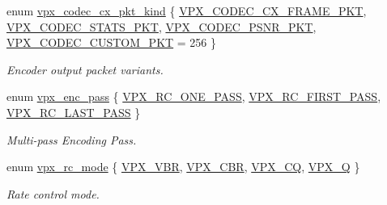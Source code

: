 \begin{DoxyCompactItemize}
\item 
enum \hyperlink{group__encoder_ga28a79375279536526552af3a83d2ed72}{vpx\-\_\-codec\-\_\-cx\-\_\-pkt\-\_\-kind} \{ \hyperlink{group__encoder_gga28a79375279536526552af3a83d2ed72a2261aae5594289400e812fb1e6b6b0cc}{\-V\-P\-X\-\_\-\-C\-O\-D\-E\-C\-\_\-\-C\-X\-\_\-\-F\-R\-A\-M\-E\-\_\-\-P\-K\-T}, 
\hyperlink{group__encoder_gga28a79375279536526552af3a83d2ed72a77cd8b95d9891bcce36117f5f31994fd}{\-V\-P\-X\-\_\-\-C\-O\-D\-E\-C\-\_\-\-S\-T\-A\-T\-S\-\_\-\-P\-K\-T}, 
\hyperlink{group__encoder_gga28a79375279536526552af3a83d2ed72a11eefa1328e6d22eb7c844645a260628}{\-V\-P\-X\-\_\-\-C\-O\-D\-E\-C\-\_\-\-P\-S\-N\-R\-\_\-\-P\-K\-T}, 
\hyperlink{group__encoder_gga28a79375279536526552af3a83d2ed72a7b54c122969397b1926de853d28b3c80}{\-V\-P\-X\-\_\-\-C\-O\-D\-E\-C\-\_\-\-C\-U\-S\-T\-O\-M\-\_\-\-P\-K\-T} =  256
 \}
\begin{DoxyCompactList}\small\item\em \-Encoder output packet variants. \end{DoxyCompactList}\item 
enum \hyperlink{group__encoder_ga476c5417f9c15a1dc5d3f68fa44c493f}{vpx\-\_\-enc\-\_\-pass} \{ \hyperlink{group__encoder_gga476c5417f9c15a1dc5d3f68fa44c493fa7b6943a41868e8e26a77e9500f139ca1}{\-V\-P\-X\-\_\-\-R\-C\-\_\-\-O\-N\-E\-\_\-\-P\-A\-S\-S}, 
\hyperlink{group__encoder_gga476c5417f9c15a1dc5d3f68fa44c493faa0765945345b160905f3b762986dae3b}{\-V\-P\-X\-\_\-\-R\-C\-\_\-\-F\-I\-R\-S\-T\-\_\-\-P\-A\-S\-S}, 
\hyperlink{group__encoder_gga476c5417f9c15a1dc5d3f68fa44c493fa65da543b956d6a9b1f301ab8cc90d3a7}{\-V\-P\-X\-\_\-\-R\-C\-\_\-\-L\-A\-S\-T\-\_\-\-P\-A\-S\-S}
 \}
\begin{DoxyCompactList}\small\item\em \-Multi-\/pass \-Encoding \-Pass. \end{DoxyCompactList}\item 
enum \hyperlink{group__encoder_gaf50e74d91be4cae6f70dfeba5b7410d2}{vpx\-\_\-rc\-\_\-mode} \{ \hyperlink{group__encoder_ggaf50e74d91be4cae6f70dfeba5b7410d2ab8fbe4441ed3f31a167c8194e8a64f87}{\-V\-P\-X\-\_\-\-V\-B\-R}, 
\hyperlink{group__encoder_ggaf50e74d91be4cae6f70dfeba5b7410d2a8b02853cb35790d60cc171a11f6c268a}{\-V\-P\-X\-\_\-\-C\-B\-R}, 
\hyperlink{group__encoder_ggaf50e74d91be4cae6f70dfeba5b7410d2a5f2fd02b55c67d62bfd79380bcb03f63}{\-V\-P\-X\-\_\-\-C\-Q}, 
\hyperlink{group__encoder_ggaf50e74d91be4cae6f70dfeba5b7410d2a5ebb5564dc5e8ec99d3c6221d89b8858}{\-V\-P\-X\-\_\-\-Q}
 \}
\begin{DoxyCompactList}\small\item\em \-Rate control mode. \end{DoxyCompactList}\item 

\end{DoxyCompactItemize}
